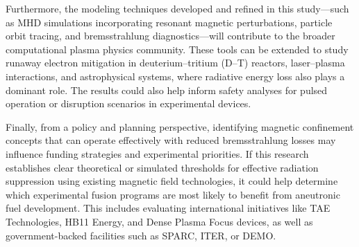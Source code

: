 \documentclass[12pt]{article}
\begin{document}
    Furthermore, the modeling techniques developed and refined in this study—such as MHD simulations incorporating resonant magnetic perturbations, particle orbit tracing, and bremsstrahlung diagnostics—will contribute to the broader computational plasma physics community. These tools can be extended to study runaway electron mitigation in deuterium–tritium (D–T) reactors, laser–plasma interactions, and astrophysical systems, where radiative energy loss also plays a dominant role. The results could also help inform safety analyses for pulsed operation or disruption scenarios in experimental devices.

    Finally, from a policy and planning perspective, identifying magnetic confinement concepts that can operate effectively with reduced bremsstrahlung losses may influence funding strategies and experimental priorities. If this research establishes clear theoretical or simulated thresholds for effective radiation suppression using existing magnetic field technologies, it could help determine which experimental fusion programs are most likely to benefit from aneutronic fuel development. This includes evaluating international initiatives like TAE Technologies, HB11 Energy, and Dense Plasma Focus devices, as well as government-backed facilities such as SPARC, ITER, or DEMO.

\printbibliography    
\end{document}
